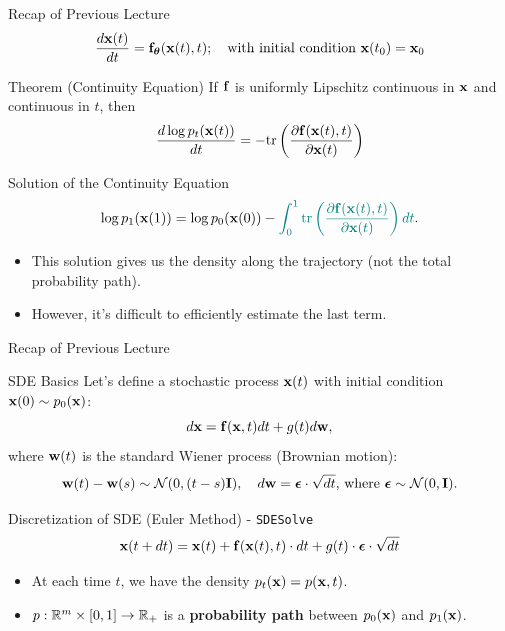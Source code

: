 \documentclass{beamer}
\begin{document}
\begin{frame}
\titlepage
	\resetonslide
\end{frame}
\begin{frame}{Recap of Previous Lecture}
	\[
 		\frac{d \mathbf{x}(t)}{dt} = \mathbf{f}_{\boldsymbol{\theta}}(\mathbf{x}(t), t); \quad \text{with initial condition }\mathbf{x}(t_0) = \mathbf{x}_0
	\]
	\vspace{-0.3cm}
	\begin{block}{Theorem (Continuity Equation)}
		If $\mathbf{f}$ is uniformly Lipschitz continuous in $\mathbf{x}$ and continuous in $t$, then
		\[
			\frac{d \log p_t(\mathbf{x}(t))}{d t} = - \text{tr} \left( \frac{\partial \mathbf{f}(\mathbf{x}(t), t)}{\partial \mathbf{x}(t)} \right)
		\]
		\vspace{-0.5cm}
	\end{block}
	\begin{block}{Solution of the Continuity Equation}
		\vspace{-0.3cm}
		\[
			\log p_1(\mathbf{x}(1)) = \log p_0(\mathbf{x}(0)) - {\color{teal}\int_{0}^{1} \text{tr}  \left( \frac{\partial \mathbf{f}(\mathbf{x}(t), t)}{\partial \mathbf{x}(t)} \right) dt}.
		\]
	\end{block}
	\begin{itemize}
		\item This solution gives us the density along the trajectory (not the total probability path).
		\item However, it's difficult to efficiently estimate {\color{teal}the last term}.
	 \end{itemize}
\end{frame}
\begin{frame}{Recap of Previous Lecture}
	\vspace{-0.2cm}
	\begin{block}{SDE Basics}
		Let's define a stochastic process $\mathbf{x}(t)$ with initial condition $\mathbf{x}(0) \sim p_0(\mathbf{x})$:
		\[
			d\mathbf{x} = \mathbf{f}(\mathbf{x}, t) dt + g(t) d \mathbf{w}, 
		\]
		where $\mathbf{w}(t)$ is the standard Wiener process (Brownian motion):
		\vspace{-0.2cm}
		\[		
			\mathbf{w}(t) - \mathbf{w}(s) \sim \mathcal{N}(0, (t - s) \mathbf{I}), \quad d \mathbf{w} = \boldsymbol{\epsilon} \cdot \sqrt{dt}, \, \text{where } \boldsymbol{\epsilon} \sim \mathcal{N}(0, \mathbf{I}).
		\]
	\end{block}
	\vspace{-0.3cm}
	\begin{block}{Discretization of SDE (Euler Method) - \texttt{SDESolve}}
		\vspace{-0.3cm}
		\[
			\mathbf{x}(t + dt) = \mathbf{x}(t) + \mathbf{f}(\mathbf{x}(t), t) \cdot dt + g(t) \cdot \boldsymbol{\epsilon} \cdot \sqrt{dt}
		\]
		\vspace{-0.3cm}
	\end{block}
	\begin{itemize}
		\item At each time $t$, we have the density $p_t(\mathbf{x}) = p(\mathbf{x}, t)$.
		\item $p: \mathbb{R}^m \times [0, 1] \rightarrow \mathbb{R}_+$ is a \textbf{probability path} between $p_0(\mathbf{x})$ and $p_1(\mathbf{x})$.
	\end{itemize}
\end{frame}
\end{document}
